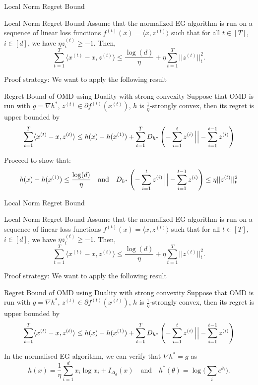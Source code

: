 \begin{frame}{Local Norm Regret Bound}
    \scriptsize
    \begin{block}{Local Norm Regret Bound}
    Assume that the normalized EG algorithm is run on a sequence of linear loss functions $f^{(t)}(x) = \langle x, z^{(t)} \rangle$ such that for all $t \in [T]$, $i \in [d]$, we have $\eta z^{(t)}_i \geq -1$. Then,
    $$
    \sum_{t=1}^T \langle x^{(t)} - x, z^{(t)} \rangle
    \leq \frac{\log(d)}{\eta} + \eta \sum_{t=1}^T ||z^{(t)}||^2_t.
    $$
    \end{block}
    Proof strategy: We want to apply the following result
    \begin{block}{Regret Bound of OMD using Duality with strong convexity}
        Suppose that OMD is run with $g = \nabla h^*$, $z^{(t)} \in \partial f^{(t)}(x^{(t)})$, $h$ is $\frac{1}{\eta}$-strongly convex, then its regret is upper bounded by
        $$
        \sum_{t=1}^T\langle x^{(t)} - x, z^{(t)} \rangle \leq h(x) - h(x^{(1)}) + \sum_{t=1}^T D_{h^*}\left(-\sum_{i=1}^t z^{(i)} \left\vert \vphantom{\frac{a}{b}} \right\vert  -\sum_{i=1}^{t-1}z^{(i)}\right)
        $$
    \end{block}\pause
    Proceed to show that:
    $$h(x) - h(x^{(1)}) \leq \frac{\log(d)}{\eta} \quad \text{and} \quad D_{h^*}\left(-\sum_{i=1}^t z^{(i)} \left\vert \vphantom{\frac{a}{b}} \right\vert  -\sum_{i=1}^{t-1}z^{(i)}\right) \leq \eta ||z^{(t)}||^2_t$$
\end{frame}

\begin{frame}{Local Norm Regret Bound}
    \scriptsize
    \begin{block}{Local Norm Regret Bound}
    Assume that the normalized EG algorithm is run on a sequence of linear loss functions $f^{(t)}(x) = \langle x, z^{(t)} \rangle$ such that for all $t \in [T]$, $i \in [d]$, we have $\eta z^{(t)}_i \geq -1$. Then,
    $$
    \sum_{t=1}^T \langle x^{(t)} - x, z^{(t)} \rangle
    \leq \frac{\log(d)}{\eta} + \eta \sum_{t=1}^T ||z^{(t)}||^2_t.
    $$
    \end{block}
    Proof strategy: We want to apply the following result
    \begin{block}{Regret Bound of OMD using Duality with strong convexity}
        Suppose that OMD is run with $g = \nabla h^*$, $z^{(t)} \in \partial f^{(t)}(x^{(t)})$, $h$ is $\frac{1}{\eta}$-strongly convex, then its regret is upper bounded by
        $$
        \sum_{t=1}^T\langle x^{(t)} - x, z^{(t)} \rangle \leq h(x) - h(x^{(1)}) + \sum_{t=1}^T D_{h^*}\left(-\sum_{i=1}^t z^{(i)} \left\vert \vphantom{\frac{a}{b}} \right\vert  -\sum_{i=1}^{t-1}z^{(i)}\right)
        $$
    \end{block}
    In the normalised EG algorithm, we can verify that $\nabla h^* = g$ as
    $$
    h(x) = \frac{1}{\eta}\sum_{i=1}^d x_i \log x_i + I_{\Delta_d}(x) \quad \text{and} \quad 
    h^*(\theta) = \log\big(\sum_i e^{\theta_i}\big).
    $$
\end{frame}

